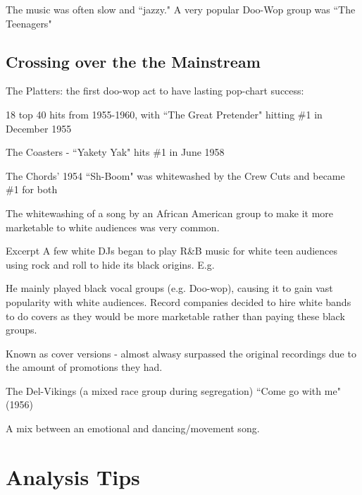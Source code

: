 \documentclass[12pt, a4paper, twoside, openright, titlepage]{book}
\begin{document}
The music was often slow and ``jazzy." A very popular Doo-Wop group was ``The Teenagers"


\subsection{Crossing over the the Mainstream}

\begin{eg}{}{}
    The Platters: the first doo-wop act to have lasting pop-chart success:

    18 top 40 hits from 1955-1960, with ``The Great Pretender" hitting \#1 in December 1955
\end{eg}

\begin{eg}{}{}
    The Coasters - ``Yakety Yak" hits \#1 in June 1958
\end{eg}

\begin{eg}{}{}
    The Chords' 1954 ``Sh-Boom" was whitewashed by the Crew Cuts and became \#1 for both
\end{eg}

The whitewashing of a song by an African American group to make it more marketable to white audiences was very common.

\begin{rmk}{Excerpt}{}
    A few white DJs began to play R\&B music for white teen audiences using rock and roll to hide its black origins. E.g. 

    He mainly played black vocal groups (e.g. Doo-wop), causing it to gain vast popularity with white audiences. Record companies decided to hire white bands to do covers as they would be more marketable rather than paying these black groups.


    Known as cover versions - almost alwasy surpassed the original recordings due to the amount of promotions they had.
\end{rmk}

\begin{eg}{}{}
    The Del-Vikings (a mixed race group during segregation) ``Come go with me" (1956)

    A mix between an emotional and dancing/movement song.
\end{eg}


\section{Analysis Tips}
\end{document}
